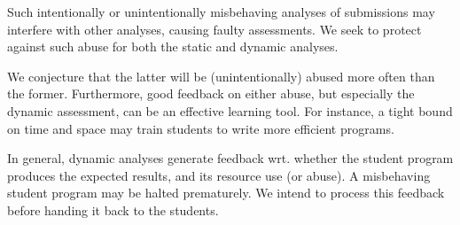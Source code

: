 Such intentionally or unintentionally misbehaving analyses of submissions may
interfere with other analyses, causing faulty assessments. We seek to protect
against such abuse for both the static and dynamic analyses.

We conjecture that the latter will be (unintentionally) abused more often than
the former. Furthermore, good feedback on either abuse, but especially the
dynamic assessment, can be an effective learning tool. For instance, a tight
bound on time and space may train students to write more efficient programs.

In general, dynamic analyses generate feedback wrt. whether the student program
produces the expected results, and its resource use (or abuse). A misbehaving
student program may be halted prematurely. We intend to process this feedback
before handing it back to the students.
